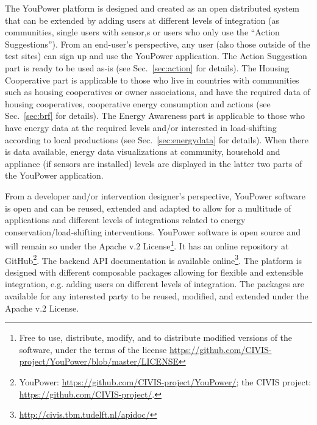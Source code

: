 The YouPower platform is designed and created as an open distributed system that can be extended by adding users at different levels of integration (as communities, single users with sensor,s or users who only use the ``Action Suggestions''). 
From an end-user's perspective, any user (also those outside of the test sites) can sign up and use the YouPower application. 
The Action Suggestion part is ready to be used as-is (see Sec.~\ref{sec:action} for details). The Housing Cooperative part is applicable to those who live in countries with communities such as housing cooperatives or owner associations, and have the required data of housing cooperatives, cooperative energy consumption and actions (see Sec.~\ref{sec:brf} for details). The Energy Awareness part is applicable to those who have energy data at the required levels and/or interested in load-shifting according to local productions (see Sec.~\ref{sec:energydata} for details). When there is data available, energy data visualizations at community, household and appliance (if sensors are installed) levels are displayed in the latter two parts of the YouPower application. 

From a developer and/or intervention designer's perspective, YouPower software is open and can be reused, extended and adapted to allow for a multitude of applications and different levels of integrations related to energy conservation/load-shifting interventions. 
YouPower software is open source and will remain so under the Apache v.2 License\footnote{Free to use, distribute, modify, and to distribute modified versions of the software, under the terms of the license  \url{https://github.com/CIVIS-project/YouPower/blob/master/LICENSE}}. It has  an online repository at GitHub\footnote{YouPower: \url{https://github.com/CIVIS-project/YouPower/}; the CIVIS project: \url{https://github.com/CIVIS-project/}.}. 
The backend API documentation is available online\footnote{\url{http://civis.tbm.tudelft.nl/apidoc/}}. 
% 
The platform is designed with different composable packages allowing for flexible and extensible integration, e.g. adding users on different levels of integration. The packages are available for any interested party to be reused, modified, and extended under the Apache v.2 License. 






